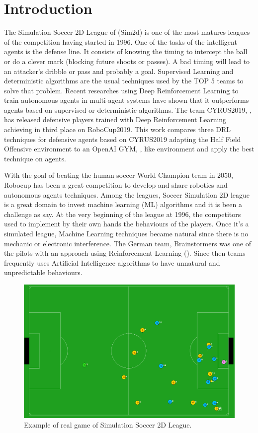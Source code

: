 \chapter{Introduction}
The Simulation Soccer 2D League of \cite{robocup} (Sim2d) is one of the most matures leagues of the competition having started in 1996. One of the tasks of the intelligent agents is the defense line. It consists of knowing the timing to intercept the ball or do a clever mark (blocking future shoots or passes). A bad timing will lead to an attacker's dribble or pass and probably a goal. Supervised Learning and deterministic algorithms are the usual techniques used by the TOP 5 teams to solve that problem. Recent researches using Deep Reinforcement Learning to train autonomous agents in multi-agent systems have shown that it outperforms agents based on supervised or deterministic algorithms. The team CYRUS2019, \cite{cyrus}, has released defensive players trained with Deep Reinforcement Learning achieving in third place on RoboCup2019. This work compares three DRL techniques for defensive agents based on CYRUS2019 adapting the Half Field Offensive environment to an OpenAI GYM, \cite{gym}, like environment and apply the best technique on \cite{robocin} agents.

With the goal of beating the human soccer World Champion team in 2050, Robocup has been a great competition to develop and share robotics and autonomous agents techniques. Among the leagues, Soccer Simulation 2D league is a great domain to invest machine learning (ML) algorithms and it is been a challenge as \cite{RoboCupAIChallenge} say. At the very beginning of the league at 1996, the competitors used to implement by their own hands the behaviours of the players. Once it's a simulated league, Machine Learning techniques became natural since there is no mechanic or electronic interference. The German team, Brainstormers was one of the pilots with an approach using Reinforcement Learning (\cite{brainstormers2002}). Since then teams frequently uses Artificial Intelligence algorithms to have unnatural and unpredictable behaviours. 

\begin{figure}[H]
    \centering
    \includegraphics[scale=0.2]{images/ss2dex.png}
    \caption{Example of real game of Simulation Soccer 2D League.}
    \label{fig:ss2dex}
\end{figure}


